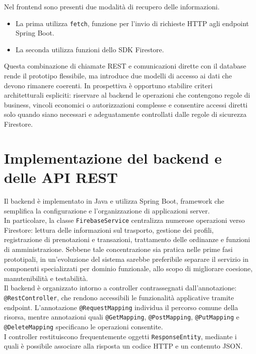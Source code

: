 \noindent
Nel frontend sono presenti due modalità di recupero delle informazioni. 
\begin{itemize}
    \item La prima utilizza \texttt{fetch}, funzione per l'invio di richieste HTTP agli endpoint Spring Boot.
    \item La seconda utilizza funzioni dello SDK Firestore.
\end{itemize}
\vspace{0.5em}
Questa combinazione di chiamate REST e comunicazioni dirette con il database rende il prototipo flessibile, ma introduce due modelli di accesso ai dati che devono rimanere coerenti. In prospettiva è opportuno stabilire criteri architetturali espliciti: riservare al backend le operazioni che contengono regole di business, vincoli economici o autorizzazioni complesse e consentire accessi diretti solo quando siano necessari e adeguatamente controllati dalle regole di sicurezza Firestore.

\section{Implementazione del backend e delle API REST}
Il backend è implementato in Java e utilizza Spring Boot, framework che semplifica la configurazione e l'organizzazione di applicazioni server. 
\\
In particolare, la classe \texttt{FirebaseService} centralizza numerose operazioni verso Firestore: lettura delle informazioni sul trasporto, gestione dei profili, registrazione di prenotazioni e transazioni, trattamento delle ordinanze e funzioni di amministrazione. Sebbene tale concentrazione sia pratica nelle prime fasi prototipali, in un'evoluzione del sistema sarebbe preferibile separare il servizio in componenti specializzati per dominio funzionale, allo scopo di migliorare coesione, manutenibilità e testabilità.
\\
Il backend è organizzato intorno a controller contrassegnati dall'annotazione: 
\\
\texttt{@RestController}, che rendono accessibili le funzionalità applicative tramite endpoint. L'annotazione \texttt{@RequestMapping} individua il percorso comune della risorsa, mentre annotazioni quali \texttt{@GetMapping}, \texttt{@PostMapping}, \texttt{@PutMapping} e \texttt{@DeleteMapping} specificano le operazioni consentite. 
\\
I controller restituiscono frequentemente oggetti \texttt{ResponseEntity}, mediante i quali è possibile associare alla risposta un codice HTTP e un contenuto JSON.

